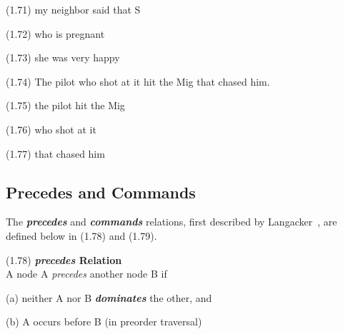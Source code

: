 \documentclass{article}
\begin{document}
\begin{enumerate*}
\item[(1.71)] my neighbor said that S
\item[(1.72)] who is pregnant
\item[(1.73)] she was very happy
\end{enumerate*}

\bigbreak
\begin{minipage}{\textwidth}
\begin{enumerate*}
\item[(1.74)] The pilot who shot at it hit the Mig that chased
him.
\end{enumerate*}
\bigbreak
\centering
{}
\bigbreak
\vbox{}
\end{minipage}
\bigbreak

\begin{enumerate*}
\item[(1.75)] the pilot hit the Mig
\item[(1.76)] who shot at it
\item[(1.77)] that chased him
\end{enumerate*}


\subsection{Precedes and Commands}

The \textbf{\textit{precedes}} and \textbf{\textit{commands}}
relations, first described by Langacker~\cite{Langacker69},
are defined below in (1.78) and (1.79).

\begin{enumerate*}
\item[(1.78)] \textbf{\textit{precedes} Relation}\\
A node A \textit{precedes} another node B if
    \begin{enumerate*}
    \item[(a)] neither A nor B \textbf{\textit{dominates}} the other, and
    \item[(b)] A occurs before B (in preorder traversal)
    \end{enumerate*}
\end{enumerate*}
\end{document}

